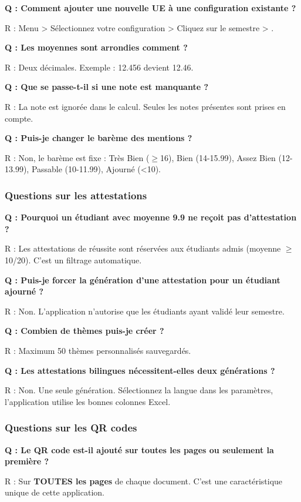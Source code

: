 \textbf{Q : Comment ajouter une nouvelle UE à une configuration existante ?}

R : Menu  > Sélectionnez votre configuration > Cliquez sur le semestre > .

\textbf{Q : Les moyennes sont arrondies comment ?}

R : Deux décimales. Exemple : 12.456 devient 12.46.

\textbf{Q : Que se passe-t-il si une note est manquante ?}

R : La note est ignorée dans le calcul. Seules les notes présentes sont prises en compte.

\textbf{Q : Puis-je changer le barème des mentions ?}

R : Non, le barème est fixe : Très Bien ($\geq$16), Bien (14-15.99), Assez Bien (12-13.99), Passable (10-11.99), Ajourné (<10).

\subsubsection{Questions sur les attestations}

\textbf{Q : Pourquoi un étudiant avec moyenne 9.9 ne reçoit pas d'attestation ?}

R : Les attestations de réussite sont réservées aux étudiants admis (moyenne $\geq$ 10/20). C'est un filtrage automatique.

\textbf{Q : Puis-je forcer la génération d'une attestation pour un étudiant ajourné ?}

R : Non. L'application n'autorise que les étudiants ayant validé leur semestre.

\textbf{Q : Combien de thèmes puis-je créer ?}

R : Maximum 50 thèmes personnalisés sauvegardés.

\textbf{Q : Les attestations bilingues nécessitent-elles deux générations ?}

R : Non. Une seule génération. Sélectionnez la langue dans les paramètres, l'application utilise les bonnes colonnes Excel.

\subsubsection{Questions sur les QR codes}

\textbf{Q : Le QR code est-il ajouté sur toutes les pages ou seulement la première ?}

R : Sur \textbf{TOUTES les pages} de chaque document. C'est une caractéristique unique de cette application.

